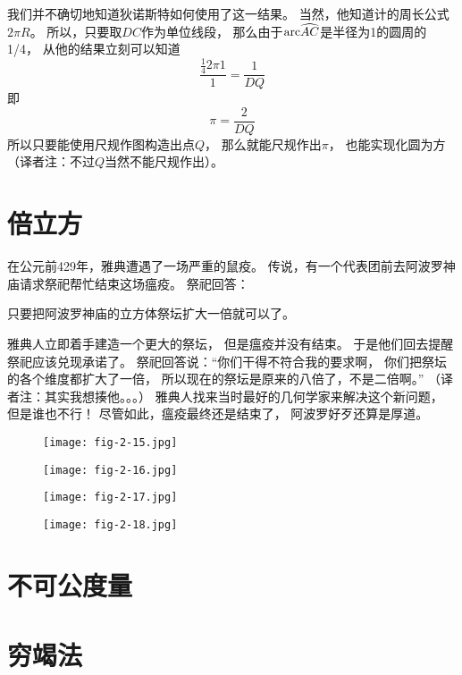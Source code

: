 \documentclass[cn,fancy,blue,11pt]{elegantbook}
\newcommand{\arc}{{\rm arc}\widehat}
\begin{document}
我们并不确切地知道狄诺斯特如何使用了这一结果。
当然，他知道计的周长公式$2\pi R$。
所以，只要取$DC$作为单位线段，
那么由于$\arc{AC}$是半径为1的圆周的1/4，
从他的结果立刻可以知道
\[\frac{\frac{1}{4}2\pi 1}{1}=\frac{1}{DQ}\]
即\[\pi=\frac{2}{DQ}\]
所以只要能使用尺规作图构造出点$Q$，
那么就能尺规作出$\pi$，
也能实现化圆为方（译者注：不过$Q$当然不能尺规作出）。

\section{倍立方}

在公元前429年，雅典遭遇了一场严重的鼠疫。
传说，有一个代表团前去阿波罗神庙请求祭祀帮忙结束这场瘟疫。
祭祀回答：
\begin{framed}
	只要把阿波罗神庙的立方体祭坛扩大一倍就可以了。
\end{framed}
雅典人立即着手建造一个更大的祭坛，
但是瘟疫并没有结束。
于是他们回去提醒祭祀应该兑现承诺了。
祭祀回答说：``你们干得不符合我的要求啊，
你们把祭坛的各个维度都扩大了一倍，
所以现在的祭坛是原来的八倍了，不是二倍啊。''
（译者注：其实我想揍他。。。）
雅典人找来当时最好的几何学家来解决这个新问题，
但是谁也不行！
尽管如此，瘟疫最终还是结束了，
阿波罗好歹还算是厚道。



\begin{figure}[htbp]
	\centering
	\texttt{[image: fig-2-15.jpg]}
	\caption{\label{fig:2-15}}
\end{figure}

\begin{figure}[htbp]
	\centering
	\texttt{[image: fig-2-16.jpg]}
	\caption{\label{fig:2-16}}
\end{figure}

\begin{figure}[htbp]
	\centering
	\texttt{[image: fig-2-17.jpg]}
	\caption{\label{fig:2-17}}
\end{figure}

\begin{figure}[htbp]
	\centering
	\texttt{[image: fig-2-18.jpg]}
	\caption{\label{fig:2-18}}
\end{figure}

\section{不可公度量}

\section{穷竭法}
\end{document}
